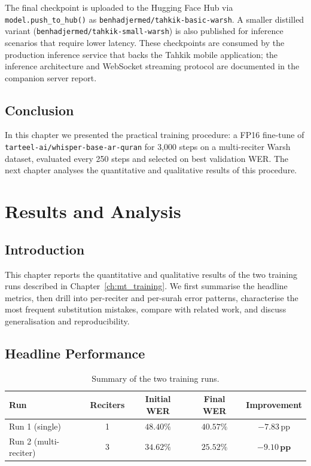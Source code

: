 \documentclass[12pt,a4paper]{report}
\begin{document}
The final checkpoint is uploaded to the Hugging Face Hub via
\texttt{model.push\_to\_hub()} as \texttt{benhadjermed/tahkik-basic-warsh}.
A smaller distilled variant (\texttt{benhadjermed/tahkik-small-warsh}) is
also published for inference scenarios that require lower latency.
These checkpoints are consumed by the production inference service that
backs the Tahkik mobile application; the inference architecture and
WebSocket streaming protocol are documented in the companion server
report.

\section{Conclusion}
In this chapter we presented the practical training procedure: a
FP16 fine-tune of \texttt{tarteel-ai/whisper-base-ar-quran} for
3{,}000 steps on a multi-reciter Warsh dataset, evaluated every 250
steps and selected on best validation WER. The next chapter analyses
the quantitative and qualitative results of this procedure.

\chapter{Results and Analysis}
\label{ch:mt_results}

\section{Introduction}
This chapter reports the quantitative and qualitative results of the two
training runs described in Chapter~\ref{ch:mt_training}. We first
summarise the headline metrics, then drill into per-reciter and
per-surah error patterns, characterise the most frequent substitution
mistakes, compare with related work, and discuss generalisation and
reproducibility.

\section{Headline Performance}

\begin{table}[H]
  \centering
  \caption{Summary of the two training runs.}
  \label{tab:mt_headline}
  \renewcommand{\arraystretch}{1.35}
  \begin{tabular}{lcccc}
    \toprule
    \textbf{Run} & \textbf{Reciters} & \textbf{Initial WER} & \textbf{Final WER} & \textbf{Improvement} \\
    \midrule
    Run 1 (single)        & 1   & $48.40\%$ & $40.57\%$ & $-7.83$\,pp \\
    Run 2 (multi-reciter) & 3   & $34.62\%$ & $\mathbf{25.52\%}$ & $\mathbf{-9.10\,pp}$ \\
    \bottomrule
  \end{tabular}
\end{table}
\end{document}
